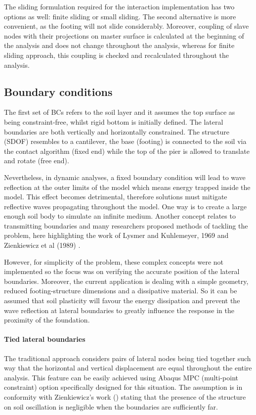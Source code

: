 The sliding formulation required for the interaction implementation has two options as well: finite sliding or small sliding. The second alternative is more convenient, as the footing will not slide considerably. Moreover, coupling of slave nodes with their projections on master surface is calculated at the beginning of the analysis and does not change throughout the analysis, whereas for finite sliding approach, this coupling is checked and recalculated throughout the analysis.

\subsection{Boundary conditions}
The first set of BCs refers to the soil layer and it assumes the top surface as being constraint-free, whilst rigid bottom is initially defined. The lateral boundaries are both vertically and horizontally constrained. The structure (SDOF) resembles to a cantilever, the base (footing) is connected to the soil via the contact algorithm (fixed end) while the top of the pier is allowed to translate and rotate (free end).

Nevertheless, in dynamic analyses, a fixed boundary condition will lead to wave reflection at the outer limits of the model which means energy trapped inside the model. This effect becomes detrimental, therefore solutions must mitigate reflective waves propagating throughout the model. One way is to create a large enough soil body to simulate an infinite medium. Another concept relates to transmitting boundaries and many researchers proposed methods of tackling the problem, here highlighting the work of Lysmer and Kuhlemeyer, 1969 \cite{lysmer1969finite} and Zienkiewicz et al (1989) \cite{zienkiewicz1989earthquake}.

However, for simplicity of the problem, these complex concepts were not implemented so the focus was on verifying the accurate position of the lateral boundaries. Moreover, the current application is dealing with a simple geometry, reduced  footing-structure dimensions and a dissipative material. So it can be assumed that soil plasticity will favour the energy dissipation and prevent the wave reflection at lateral boundaries to greatly influence the response in the proximity of the foundation.

 \paragraph{Tied lateral boundaries}
	The traditional approach considers pairs of lateral nodes being tied together such way that the horizontal and vertical displacement are equal throughout the entire analysis. This feature can be easily achieved using Abaqus MPC (multi-point constraint) option specifically designed for this situation. The assumption is in conformity with Zienkiewicz's work (\cite{zienkiewicz1989earthquake}) stating that the presence of the structure on soil oscillation is negligible when the boundaries are sufficiently far.
	
